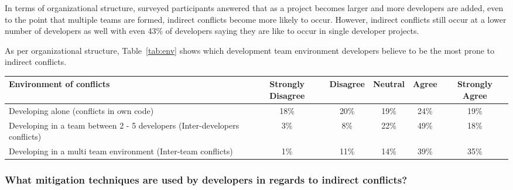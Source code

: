 In terms of organizational structure, surveyed participants answered that as a project becomes larger and more 
developers are added, even to the point that multiple teams are formed, indirect conflicts become more likely to
occur. However, indirect conflicts still occur at a lower number of developers as well with even 43\% of developers
saying they are like to occur in single developer projects.

As per organizational structure, Table~\ref{tab:env} shows which development team environment developers believe to be the most
prone to indirect conflicts.

\begin{table*}[ht]
\begin{center}
\begin{tabular}{| p{3cm} | c | c | c | c | c |}
\hline
Environment of conflicts & Strongly Disagree & Disagree & Neutral & Agree & Strongly Agree \\
\hline
\hline
Developing alone (conflicts in own code) & 18\% & 20\% & 19\% & 24\% & 19\% \\ \hline
Developing in a team between 2 - 5 developers (Inter-developers conflicts) & 3\% & 8\% & 22\% & 49\% & 18\% \\ \hline
Developing in a multi team environment (Inter-team conflicts) & 1\% & 11\% & 14\% & 39\% & 35\% \\ \hline
\end{tabular}
\end{center}
\caption{Results of survey questions to development environments in which indirect conflicts are likely to occur, in terms of percentage
of developers surveyed.\label{tab:env}}
\end{table*}

\subsubsection{What mitigation techniques are used by developers in regards to indirect conflicts?}


